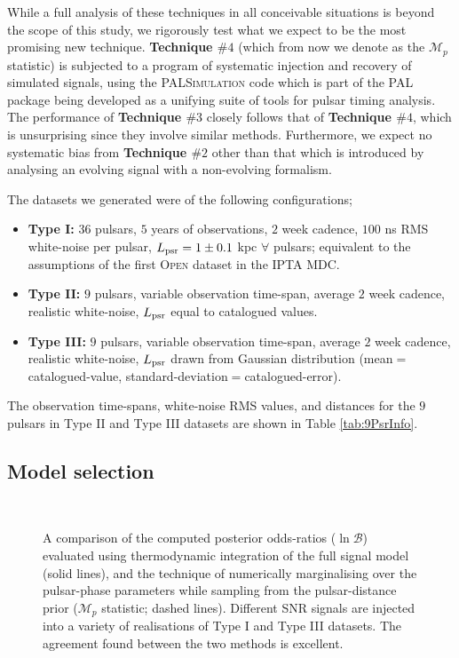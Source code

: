 \documentclass[prd,twocolumn,showpacs,nofootinbib]{revtex4}
\newcommand{\incgraph}[3]{\texttt{[image: \#3]}}
\begin{document}
While a full analysis of these techniques in all conceivable situations is beyond the scope of this study, we rigorously test what we expect to be the most promising new technique. {\bf Technique $\#4$} (which from now we denote as the {\bf $\mathcal{M}_p$} statistic) is subjected to a program of systematic injection and recovery of simulated signals, using the \textsc{PALSimulation} code which is part of the \textsc{PAL} package \citep{PAL-site} being developed as a unifying suite of tools for pulsar timing analysis. The performance of {\bf Technique $\#3$} closely follows that of {\bf Technique $\#4$}, which is unsurprising since they involve similar methods. Furthermore, we expect no systematic bias from {\bf Technique $\#2$} other than that which is introduced by analysing an evolving signal with a non-evolving formalism.

The datasets we generated were of the following configurations;

\begin{itemize}

\item {\bf Type I:} $36$ pulsars, $5$ years of observations, $2$ week cadence, $100$ ns RMS white-noise per pulsar, $L_{\rm psr}=1\pm0.1$ kpc $\forall$ pulsars; equivalent to the assumptions of the first \textsc{Open} dataset in the IPTA MDC.%

\item {\bf Type II:} $9$ pulsars, variable observation time-span, average $2$ week cadence, realistic white-noise, $L_{\rm psr}$ equal to catalogued values.

\item {\bf Type III:} $9$ pulsars, variable observation time-span, average $2$ week cadence, realistic white-noise, $L_{\rm psr}$ drawn from Gaussian distribution (mean$=$catalogued-value, standard-deviation$=$catalogued-error).

\end{itemize}

The observation time-spans, white-noise RMS values, and distances for the $9$ pulsars in Type II and Type III datasets are shown in Table \ref{tab:9PsrInfo}.

\subsection{Model selection}\label{sec:model-selection}

\begin{figure}
  \centering
   \subfloat[]{\incgraph{0}{0.5}{TypeI_ev_final.pdf}}\\
   \subfloat[]{\incgraph{0}{0.5}{TypeIII_ev_final.pdf}}
   \caption{\label{fig:typeIII_bayes}A comparison of the computed posterior odds-ratios ($\ln\mathcal{B}$) evaluated using thermodynamic integration of the full signal model (solid lines), and the technique of numerically marginalising over the pulsar-phase parameters while sampling from the pulsar-distance prior ({\bf $\mathcal{M}_p$} statistic; dashed lines). Different SNR signals are injected into a variety of realisations of Type I and Type III datasets. The agreement found between the two methods is excellent.} 
 \end{figure}
\end{document}
